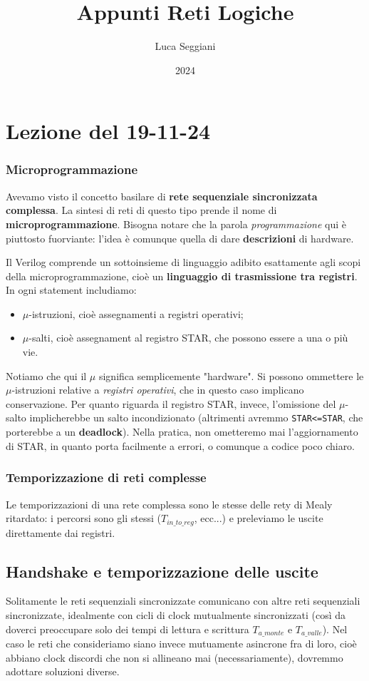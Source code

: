 \documentclass[a4paper,11pt]{article}
\title{Appunti Reti Logiche}
\author{Luca Seggiani}
\date{2024}
\begin{document}
\section{Lezione del 19-11-24}

\thispagestyle{empty}
\pagestyle{fancy}

\subsubsection{Microprogrammazione}
Avevamo visto il concetto basilare di \textbf{rete sequenziale sincronizzata complessa}.
La sintesi di reti di questo tipo prende il nome di \textbf{microprogrammazione}. 
Bisogna notare che la parola \textit{programmazione} qui è piuttosto fuorviante: l'idea è comunque quella di dare \textbf{descrizioni} di hardware.

Il Verilog comprende un sottoinsieme di linguaggio adibito esattamente agli scopi della microprogrammazione, cioè un \textbf{linguaggio di trasmissione tra registri}.
In ogni statement includiamo:
\begin{itemize}
	\item $\mu$-istruzioni, cioè assegnamenti a registri operativi;
	\item $\mu$-salti, cioè assegnament al registro STAR, che possono essere a una o più vie.
\end{itemize}
Notiamo che qui il $\mu$ significa semplicemente "hardware".
Si possono ommettere le $\mu$-istruzioni relative a \textit{registri operativi}, che in questo caso implicano conservazione.
Per quanto riguarda il registro STAR, invece, l'omissione del $\mu$-salto implicherebbe un salto incondizionato (altrimenti avremmo \lstinline|STAR<=STAR|, che porterebbe a un \textbf{deadlock}).
Nella pratica, non ometteremo mai l'aggiornamento di STAR, in quanto porta facilmente a errori, o comunque a codice poco chiaro.

\subsubsection{Temporizzazione di reti complesse}
Le temporizzazioni di una rete complessa sono le stesse delle rety di Mealy ritardato: i percorsi sono gli stessi ($T_{in\_to\_reg}$, ecc...) e preleviamo le uscite direttamente dai registri.

\subsection{Handshake e temporizzazione delle uscite}
Solitamente le reti sequenziali sincronizzate comunicano con altre reti sequenziali sincronizzate, idealmente con cicli di clock mutualmente sincronizzati (così da doverci preoccupare solo dei tempi di lettura e scrittura $T_{a\_monte}$ e $T_{a\_valle}$).
Nel caso le reti che consideriamo siano invece mutuamente asincrone fra di loro, cioè abbiano clock discordi che non si allineano mai (necessariamente), dovremmo adottare soluzioni diverse. 
\end{document}
